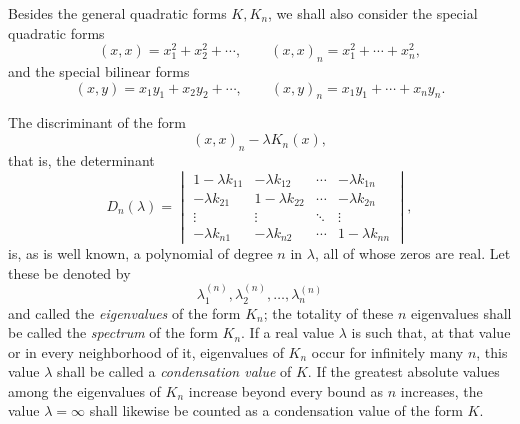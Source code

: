 \documentclass[b5paper,twoside]{article}
\newcommand{\originalpage}[1]{\phantomsection\label{origpage:#1}}
\begin{document}
Besides the general quadratic forms $K,K_n$, we shall also consider the
special quadratic forms
\[
  (x,x)=x_1^2+x_2^2+\cdots,
  \qquad
  (x,x)_n=x_1^2+\cdots+x_n^2,
\]
and the special bilinear forms
\[
  (x,y)=x_1y_1+x_2y_2+\cdots,
  \qquad
  (x,y)_n=x_1y_1+\cdots+x_ny_n.
\]

The discriminant of the form
\[
  (x,x)_n-\lambda K_n(x),
\]
that is, the determinant
\begin{equation}
\tag{1}\label{eq:1}
  D_n(\lambda)=
  \begin{vmatrix}
    1-\lambda k_{11} & -\lambda k_{12} & \cdots & -\lambda k_{1n}\\
    -\lambda k_{21} & 1-\lambda k_{22} & \cdots & -\lambda k_{2n}\\
    \vdots & \vdots & \ddots & \vdots\\
    -\lambda k_{n1} & -\lambda k_{n2} & \cdots & 1-\lambda k_{nn}
  \end{vmatrix},
\end{equation}
is, as is well known, a polynomial of degree $n$ in $\lambda$, all of whose
zeros are real.  Let these be denoted by
\[
  \lambda_1^{(n)},\lambda_2^{(n)},\ldots,\lambda_n^{(n)}
\]
\originalpage{160}and called the \emph{eigenvalues} of the form $K_n$; the totality of these
$n$ eigenvalues shall be called the \emph{spectrum} of the form $K_n$.  If a
real value $\lambda$ is such that, at that value or in every neighborhood of
it, eigenvalues of $K_n$ occur for infinitely many $n$, this value $\lambda$
shall be called a \emph{condensation value} of $K$. If the greatest absolute
values among the eigenvalues of $K_n$ increase beyond every bound as $n$
increases, the value $\lambda=\infty$ shall likewise
be counted as a condensation value of the form $K$.
\end{document}
